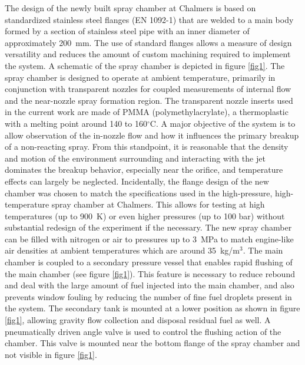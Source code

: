 \documentclass[letterpaper,twocolumn,10pt]{ilass}
\begin{document}
%
The design of the newly built spray chamber at Chalmers is based on standardized stainless
steel flanges (EN 1092-1) that are welded to a main body formed by a section of
stainless steel pipe with an inner diameter of approximately 200~mm.
%
The use of standard flanges allows a measure of design versatility and reduces the amount of custom machining required to implement the system.
A schematic of the spray chamber is depicted in figure \ref{fig1}.
%
The spray chamber is designed to operate at ambient temperature, primarily in conjunction
with transparent nozzles for coupled measurements of internal flow and the near-nozzle
spray formation region.
%
The transparent nozzle inserts used in the current work are made of PMMA (polymethylacrylate), a thermoplastic with a melting point around 140 to 160$^{\circ}$C.
%
A major objective of the system is to allow observation of the in-nozzle flow and how it
influences the primary breakup of a non-reacting spray. From this standpoint, it is reasonable
that the density and motion of the environment surrounding and interacting with the jet
dominates the breakup behavior, especially near the orifice, and temperature effects can largely be neglected.
%
Incidentally, the flange design of the new chamber was chosen to match the specifications
used in the high-pressure, high-temperature spray chamber at Chalmers. This allows for
testing at high temperatures (up to 900~K) or even higher pressures (up to 100 bar)
without substantial redesign of the experiment if the necessary.
%
The new spray chamber can be filled with nitrogen or air to pressures up to 3~MPa to
match engine-like air densities at ambient temperatures which are around 35~kg/m$^3$.
The main chamber is coupled to a secondary pressure vessel that enables rapid flushing
of the main chamber (see figure \ref{fig1}).
This feature is necessary to reduce rebound and deal with the large amount of fuel
injected into the main chamber, and also prevents window fouling by reducing the number of fine fuel droplets present in the system.
The secondary tank is mounted at a lower position as shown in figure \ref{fig1},
allowing gravity flow collection and disposal residual fuel as well.
A pneumatically driven angle valve is used to control the flushing action of the chamber.
This valve is mounted near the bottom flange of the spray chamber and not visible in figure \ref{fig1}. 
\end{document}
